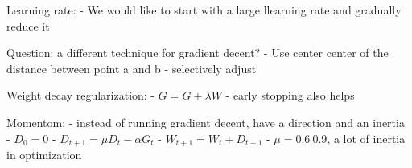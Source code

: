 Learning rate:
- We would like to start with a large llearning rate and gradually reduce it

Question: a different technique for gradient decent?
- Use center center of the distance between point a and b
- selectively adjust \alpha

Weight decay regularization:
- $G = G + \lambda W$
- early stopping also helps

Momentom:
- instead of running gradient decent, have a direction and an inertia
- $D_0 = 0$
- $D_{t+1} = \mu D_t - \alpha G_t$
- $W_{t+1} = W_t + D_{t+1}$
- $\mu = 0.6~0.9$, a lot of inertia in optimization
